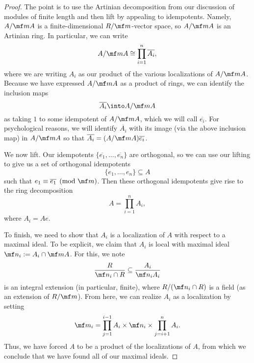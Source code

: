 \begin{proof}
	The point is to use the Artinian decomposition from our discussion of modules of finite length and then lift by appealing to idempotents. Namely, $A/\mf mA$ is a finite-dimensional $R/\mf m$-vector space, so $A/\mf mA$ is an Artinian ring. In particular, we can write
	\[A/\mf mA\cong\prod_{i=1}^n\overline{A_i},\]
	where we are writing $A_i$ as our product of the various localizations of $A/\mf mA$. Because we have expressed $A/\mf mA$ as a product of rings, we can identify the inclusion maps
	\[\overline{A_i}\into A/\mf mA\]
	as taking $1$ to some idempotent of $A/\mf mA$, which we will call $\overline{e_i}$. For psychological reasons, we will identify $\overline{A_i}$ with its image (via the above inclusion map) in $A/\mf mA$ so that $\overline{A_i}=(A/\mf mA)\overline{e_i}$. %

	We now lift. Our idempotents $\{\overline{e_1},\ldots,\overline{e_n}\}$ are orthogonal, so we can use our lifting to give us a set of orthogonal idempotents
	\[\{e_1,\ldots,e_n\}\subseteq A\]
	such that $e_1\equiv\overline{e_1}\pmod{\mf m}$. Then these orthogonal idempotents give rise to the ring decomposition
	\[A=\prod_{i=1}^nA_i,\]
	where $A_i=Ae$.

	To finish, we need to show that $A_i$ is a localization of $A$ with respect to a maximal ideal. To be explicit, we claim that $A_i$ is local with maximal ideal $\mf n_i:=A_i\cap\mf mA$. For this, we note
	\[\frac{R}{\mf n_i\cap R}\subseteq\frac{A_i}{\mf n_iA_i}\]
	is an integral extension (in particular, finite), where $R/(\mf n_i\cap R)$ is a field (as an extension of $R/\mf m$). From here, we can realize $A_i$ as a localization by setting
	\[\mf m_i=\prod_{j=1}^{i-1}A_i\times\mf n_i\times\prod_{j=i+1}^nA_i.\]
	Thus, we have forced $A$ to be a product of the localizations of $A$, from which we conclude that we have found all of our maximal ideals.
\end{proof}

